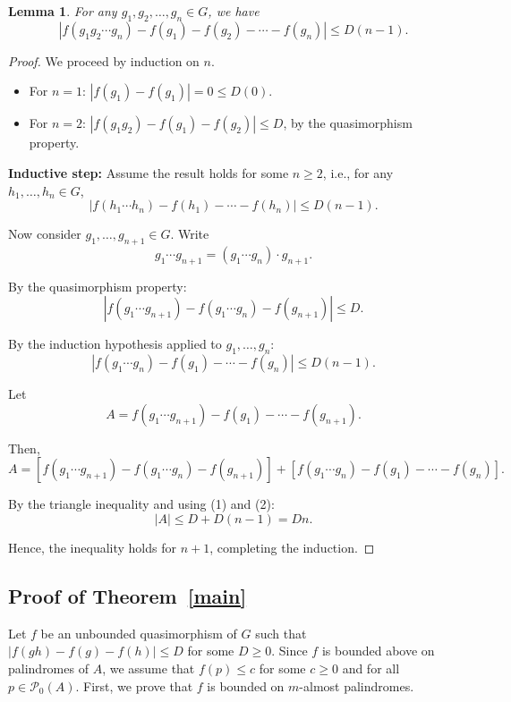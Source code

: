 \documentclass[12pt]{amsart}
\newtheorem{lemma}[theorem]{Lemma}
\theoremstyle{definition}
\theoremstyle{remark}
\numberwithin{equation}{subsection}
\theoremstyle{plain}
\numberwithin{equation}{section}
\begin{document}
\begin{lemma}\label{quasilemma2}
    For any $g_1,g_2, \ldots, g_n \in G$, we have $$|f(g_1g_2 \cdots g_n) - f(g_1) - f(g_2) - \cdots - f(g_n)| \leq D(n-1).$$
\end{lemma}

\begin{proof}
    We proceed by induction on $n$.
\begin{itemize}
    \item For $ n = 1 $: $ |f(g_1) - f(g_1)| = 0 \leq D(0) $.
    \item For $ n = 2 $: $ |f(g_1g_2) - f(g_1) - f(g_2)| \leq D $, by the quasimorphism property.
\end{itemize}

\textbf{Inductive step:}
Assume the result holds for some $ n \geq 2 $, i.e., for any $ h_1, \ldots, h_n \in G $,
\[
|f(h_1 \cdots h_n) - f(h_1) - \cdots - f(h_n)| \leq D(n - 1). \tag{IH}
\]

Now consider $ g_1, \ldots, g_{n+1} \in G $. Write
\[
g_1 \cdots g_{n+1} = (g_1 \cdots g_n) \cdot g_{n+1}.
\]

By the quasimorphism property:
\[
|f(g_1 \cdots g_{n+1}) - f(g_1 \cdots g_n) - f(g_{n+1})| \leq D. \tag{1}
\]

By the induction hypothesis applied to $ g_1, \ldots, g_n $:
\[
|f(g_1 \cdots g_n) - f(g_1) - \cdots - f(g_n)| \leq D(n - 1). \tag{2}
\]

Let
\[
A = f(g_1 \cdots g_{n+1}) - f(g_1) - \cdots - f(g_{n+1}).
\]

Then,
\[
A = \left[f(g_1 \cdots g_{n+1}) - f(g_1 \cdots g_n) - f(g_{n+1})\right] + \left[f(g_1 \cdots g_n) - f(g_1) - \cdots - f(g_n)\right].
\]

By the triangle inequality and using (1) and (2):
\[
|A| \leq D + D(n - 1) = Dn.
\]

Hence, the inequality holds for $ n+1 $, completing the induction.
\end{proof}


\subsection{Proof of Theorem~\ref{main}}
    Let $f$ be an unbounded quasimorphism of $G$ such that $|f(gh)-f(g)-f(h)| \leq D$ for some $D \geq 0$. Since $f$ is bounded above on palindromes of $A$, we assume that $f(p) \leq c$ for some $c \geq 0$ and for all $p \in \mathcal{P}_0(A)$.  First, we prove that $f$ is bounded on $m$-almost palindromes.
\end{document}
